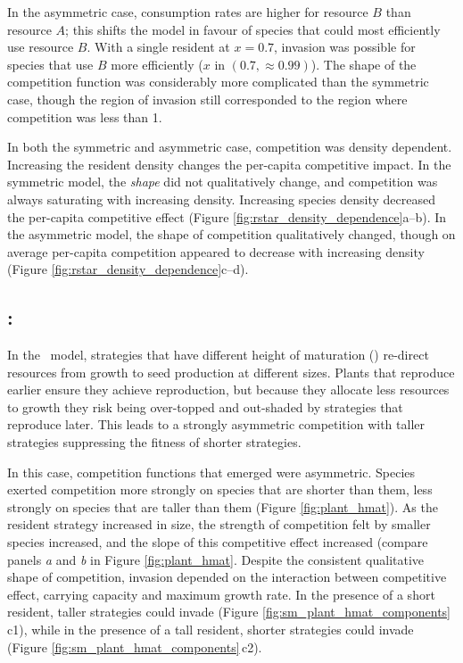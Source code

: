 \documentclass[a4paper,11pt]{article}
\begin{document}
In the asymmetric case, consumption rates are higher for
resource $B$ than resource $A$; this shifts the model in favour of
species that could most efficiently use resource $B$.
%
With a single resident at $x = 0.7$, invasion was possible for species
that use $B$ more efficiently ($x$ in $(0.7, \approx 0.99)$).
%
The shape of the competition function was considerably more
complicated than the symmetric case, though the region of invasion
still corresponded to the region where competition was less than 1.

In both the symmetric and asymmetric case, competition was density
dependent.  Increasing the resident density changes the per-capita
competitive impact.
%
In the symmetric model, the \emph{shape} did not qualitatively change,
and competition was always saturating with increasing density.
Increasing species density decreased the per-capita competitive effect
(Figure \ref{fig:rstar_density_dependence}a--b).
%
In the asymmetric model, the shape of competition qualitatively
changed, though on average per-capita competition appeared to decrease
with increasing density (Figure
\ref{fig:rstar_density_dependence}c--d).

\subsection{\plant: \hmat}

In the \plant\ model, strategies that have different height of
maturation (\hmat) re-direct resources from growth to seed production at
different sizes.  Plants that reproduce earlier ensure they achieve
reproduction, but because they allocate less resources to growth they
risk being over-topped and out-shaded by strategies that reproduce
later.  This leads to a strongly asymmetric competition with
taller strategies suppressing the fitness of shorter
strategies.

In this case, competition functions that emerged were
asymmetric. Species exerted competition more strongly on species that
are shorter than them, less strongly on species that are taller than
them (Figure \ref{fig:plant_hmat}).  As the resident strategy
increased in size, the strength of competition felt by smaller species
increased, and the slope of this competitive effect increased (compare
panels \textit{a} and \textit{b} in Figure \ref{fig:plant_hmat}.
%
Despite the consistent qualitative shape of competition, invasion
depended on the interaction between competitive effect, carrying
capacity and maximum growth rate. In the presence of a short resident,
taller strategies could invade (Figure
\ref{fig:sm_plant_hmat_components}\,c1), while in the presence of a
tall resident, shorter strategies could invade (Figure
\ref{fig:sm_plant_hmat_components}\,c2).
\end{document}
